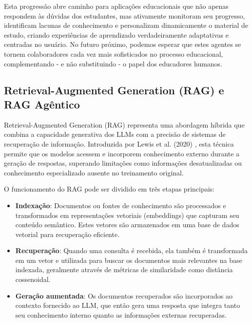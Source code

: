 \documentclass[tcc,capa]{texufpel}
\begin{document}
Esta progressão abre caminho para aplicações educacionais que não apenas respondem às dúvidas dos estudantes, mas ativamente monitoram seu progresso, identificam lacunas de conhecimento e personalizam dinamicamente o material de estudo, criando experiências de aprendizado verdadeiramente adaptativas e centradas no usuário. No futuro próximo, podemos esperar que estes agentes se tornem colaboradores cada vez mais sofisticados no processo educacional, complementando - e não substituindo - o papel dos educadores humanos.







\subsection{Retrieval-Augmented Generation (RAG) e RAG Agêntico}

Retrieval-Augmented Generation (RAG) representa uma abordagem híbrida que combina a capacidade generativa dos LLMs com a precisão de sistemas de recuperação de informação. Introduzida por Lewis et al. (2020) \cite{lewis2020retrieval}, esta técnica permite que os modelos acessem e incorporem conhecimento externo durante a geração de respostas, superando limitações como informações desatualizadas ou conhecimento especializado ausente no treinamento original.

O funcionamento do RAG pode ser dividido em três etapas principais:

\begin{itemize}
    \item \textbf{Indexação}: Documentos ou fontes de conhecimento são processados e transformados em representações vetoriais (embeddings) que capturam seu conteúdo semântico. Estes vetores são armazenados em uma base de dados vetorial para recuperação eficiente.
    
    \item \textbf{Recuperação}: Quando uma consulta é recebida, ela também é transformada em um vetor e utilizada para buscar os documentos mais relevantes na base indexada, geralmente através de métricas de similaridade como distância cossenoidal.
    
    \item \textbf{Geração aumentada}: Os documentos recuperados são incorporados ao contexto fornecido ao LLM, que então gera uma resposta que integra tanto seu conhecimento interno quanto as informações externas recuperadas.
\end{itemize}
\end{document}
